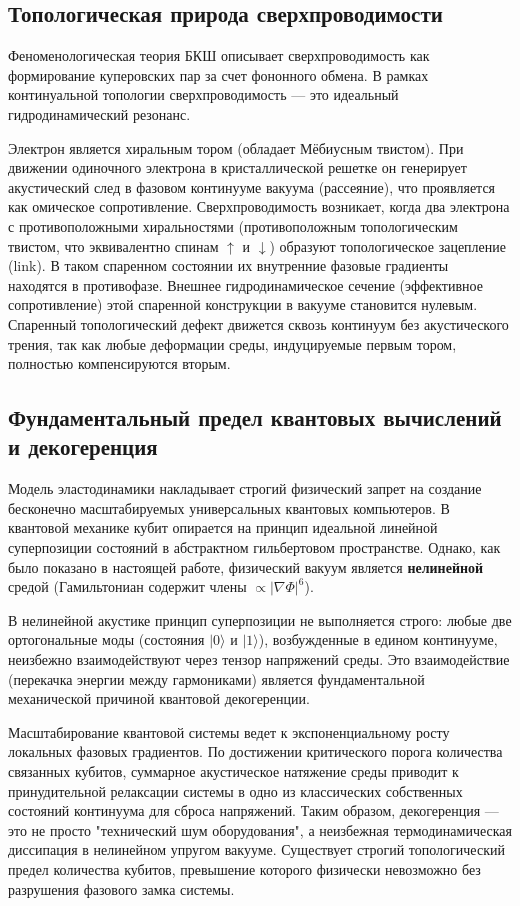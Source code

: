 \documentclass[12pt,a4paper]{article}
\begin{document}
	\subsection{Топологическая природа сверхпроводимости}
	Феноменологическая теория БКШ описывает сверхпроводимость как формирование куперовских пар за счет фононного обмена. В рамках континуальной топологии сверхпроводимость — это идеальный гидродинамический резонанс.
	
	Электрон является хиральным тором (обладает Мёбиусным твистом). При движении одиночного электрона в кристаллической решетке он генерирует акустический след в фазовом континууме вакуума (рассеяние), что проявляется как омическое сопротивление. 
	Сверхпроводимость возникает, когда два электрона с противоположными хиральностями (противоположным топологическим твистом, что эквивалентно спинам $\uparrow$ и $\downarrow$) образуют топологическое зацепление (link). В таком спаренном состоянии их внутренние фазовые градиенты находятся в противофазе. Внешнее гидродинамическое сечение (эффективное сопротивление) этой спаренной конструкции в вакууме становится нулевым. Спаренный топологический дефект движется сквозь континуум без акустического трения, так как любые деформации среды, индуцируемые первым тором, полностью компенсируются вторым.
	
	\subsection{Фундаментальный предел квантовых вычислений и декогеренция}
	Модель эластодинамики накладывает строгий физический запрет на создание бесконечно масштабируемых универсальных квантовых компьютеров. В квантовой механике кубит опирается на принцип идеальной линейной суперпозиции состояний в абстрактном гильбертовом пространстве. 
	Однако, как было показано в настоящей работе, физический вакуум является \textbf{нелинейной} средой (Гамильтониан содержит члены $\propto |\nabla \Phi|^6$).
	
	В нелинейной акустике принцип суперпозиции не выполняется строго: любые две ортогональные моды (состояния $|0\rangle$ и $|1\rangle$), возбужденные в едином континууме, неизбежно взаимодействуют через тензор напряжений среды. Это взаимодействие (перекачка энергии между гармониками) является фундаментальной механической причиной квантовой декогеренции. 
	
	Масштабирование квантовой системы ведет к экспоненциальному росту локальных фазовых градиентов. По достижении критического порога количества связанных кубитов, суммарное акустическое натяжение среды приводит к принудительной релаксации системы в одно из классических собственных состояний континуума для сброса напряжений. Таким образом, декогеренция — это не просто "технический шум оборудования", а неизбежная термодинамическая диссипация в нелинейном упругом вакууме. Существует строгий топологический предел количества кубитов, превышение которого физически невозможно без разрушения фазового замка системы.
	
\end{document}
